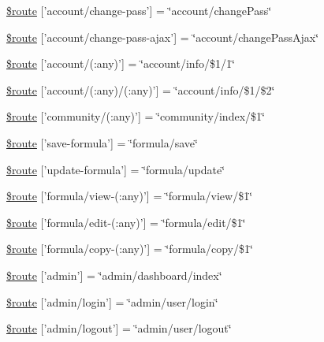 \begin{DoxyCompactItemize}
\item 
\hyperlink{routes_8php_a1f1cca6f261ccaa1eeae697a8e61b43f}{\$route} \mbox{[}'account/change-\/pass'\mbox{]} = \char`\"{}account/change\-Pass\char`\"{}
\item 
\hyperlink{routes_8php_aa49f89cc8416c60f78cb2e222776c46b}{\$route} \mbox{[}'account/change-\/pass-\/ajax'\mbox{]} = \char`\"{}account/change\-Pass\-Ajax\char`\"{}
\item 
\hyperlink{routes_8php_ab69c72ae7bdfb0b07485edc5eab66e93}{\$route} \mbox{[}'account/(\-:any)'\mbox{]} = \char`\"{}account/info/\$1/1\char`\"{}
\item 
\hyperlink{routes_8php_ae072c3bc3476a31e3cc7a4a928bccc8c}{\$route} \mbox{[}'account/(\-:any)/(\-:any)'\mbox{]} = \char`\"{}account/info/\$1/\$2\char`\"{}
\item 
\hyperlink{routes_8php_aa42a2acd00cabe0c949ace0144b32d17}{\$route} \mbox{[}'community/(\-:any)'\mbox{]} = \char`\"{}community/index/\$1\char`\"{}
\item 
\hyperlink{routes_8php_ac4025e680a101e2ed629e3c1c018a370}{\$route} \mbox{[}'save-\/formula'\mbox{]} = \char`\"{}formula/save\char`\"{}
\item 
\hyperlink{routes_8php_a13c9451005d16325e799982e006991b4}{\$route} \mbox{[}'update-\/formula'\mbox{]} = \char`\"{}formula/update\char`\"{}
\item 
\hyperlink{routes_8php_a602b5d83f6a0773216b78fecea4f64a9}{\$route} \mbox{[}'formula/view-\/(\-:any)'\mbox{]} = \char`\"{}formula/view/\$1\char`\"{}
\item 
\hyperlink{routes_8php_ae0cdd39125ebb94496dca4273c5e76ee}{\$route} \mbox{[}'formula/edit-\/(\-:any)'\mbox{]} = \char`\"{}formula/edit/\$1\char`\"{}
\item 
\hyperlink{routes_8php_aa99a1d50e0b0be556af56803c6e95925}{\$route} \mbox{[}'formula/copy-\/(\-:any)'\mbox{]} = \char`\"{}formula/copy/\$1\char`\"{}
\item 
\hyperlink{routes_8php_a740e1be77b5d698dffaec236d905a70f}{\$route} \mbox{[}'admin'\mbox{]} = \char`\"{}admin/dashboard/index\char`\"{}
\item 
\hyperlink{routes_8php_ac26b3cf61c58be1c9310292a1e1635b4}{\$route} \mbox{[}'admin/login'\mbox{]} = \char`\"{}admin/user/login\char`\"{}
\item 
\hyperlink{routes_8php_a7d9acf4789728cb04aa567b32c77e277}{\$route} \mbox{[}'admin/logout'\mbox{]} = \char`\"{}admin/user/logout\char`\"{}
\end{DoxyCompactItemize}


